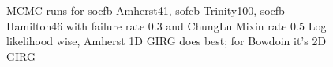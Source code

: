 \begin{figure}
  

  
    \caption{MCMC runs for socfb-Amherst41, sofcb-Trinity100, socfb-Hamilton46 with failure rate $0.3$ and ChungLu Mixin rate $0.5$ Log likelihood wise, Amherst 1D GIRG does best; for Bowdoin it's 2D GIRG}
    \label{fig:amherst_non_failure_mcmc}
\end{figure}
